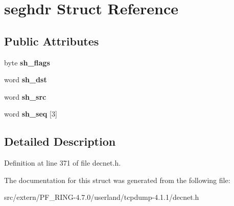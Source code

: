 \hypertarget{structseghdr}{
\section{seghdr Struct Reference}
\label{structseghdr}
}
\subsection*{Public Attributes}
\begin{DoxyCompactItemize}
\item 
\hypertarget{structseghdr_a5af2d41f67d8d67558eee35046090d2e}{
byte {\bfseries sh\_\-flags}}
\label{structseghdr_a5af2d41f67d8d67558eee35046090d2e}

\item 
\hypertarget{structseghdr_aa54b2aac39c3d45fb0fbc1a39176ae7c}{
word {\bfseries sh\_\-dst}}
\label{structseghdr_aa54b2aac39c3d45fb0fbc1a39176ae7c}

\item 
\hypertarget{structseghdr_a8565ea035f5d4e507095e6bfd6a4e7a7}{
word {\bfseries sh\_\-src}}
\label{structseghdr_a8565ea035f5d4e507095e6bfd6a4e7a7}

\item 
\hypertarget{structseghdr_a5a470494deb73b6c515aa96a8761d290}{
word {\bfseries sh\_\-seq} \mbox{[}3\mbox{]}}
\label{structseghdr_a5a470494deb73b6c515aa96a8761d290}

\end{DoxyCompactItemize}


\subsection{Detailed Description}


Definition at line 371 of file decnet.h.



The documentation for this struct was generated from the following file:\begin{DoxyCompactItemize}
\item 
src/extern/PF\_\-RING-\/4.7.0/userland/tcpdump-\/4.1.1/decnet.h\end{DoxyCompactItemize}
